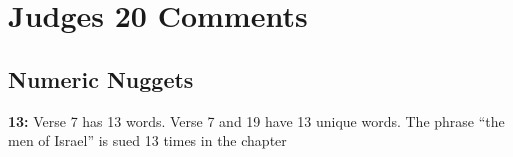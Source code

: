 \section{Judges 20 Comments}

\subsection{Numeric Nuggets}
\textbf{13: } Verse 7 has 13 words.  Verse 7 and 19 have 13 unique words. The phrase ``the men of Israel'' is sued 13 times in the chapter